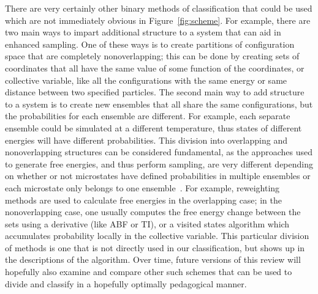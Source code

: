 \documentclass[9pt,review]{livecoms}
\begin{document}
There are very certainly other binary methods of classification that could be used which are not immediately obvious in Figure~\ref{fig:scheme}. For example, there are two main ways to impart additional structure to a system that can aid in enhanced sampling. One of these ways is to create partitions of configuration space that are completely nonoverlapping; this can be done by creating sets of coordinates that all have the same value of some function of the coordinates, or \hypertarget{ref:CV} {collective variable}, like all the configurations with the same energy or same distance between two specified particles. The second main way to add structure to a system is to create new ensembles that all share the same configurations, but the probabilities for each ensemble are different. For example, each separate ensemble could be simulated at a different temperature, thus states of different energies will have different probabilities. 
This division into overlapping and nonoverlapping structures can be considered fundamental, as the approaches used to generate free energies, and thus perform  sampling, are very different depending on whether or not microstates have defined probabilities in multiple ensembles or each microstate only belongs to one ensemble~\cite{Escobedo_unified_2005,abreu_framework_2006}. For example, reweighting methods are used to calculate free energies in the overlapping case; in the nonoverlapping case, one usually computes the free energy change between the sets using a derivative (like ABF or TI), or a visited states algorithm which accumulates probability locally in the collective variable. This particular division of methods is one that is not directly used in our classification, but shows up in the descriptions of the algorithm.  Over time, future versions of this review will hopefully also examine and compare other such schemes that can be used to divide and classify in a hopefully optimally pedagogical manner.



\end{document}
